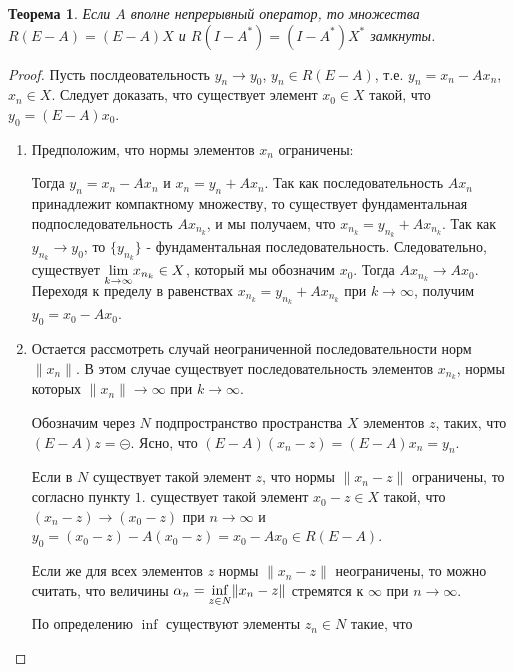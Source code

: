 \documentclass[12pt,a4paper,titlepage,oneside]{book}
\theoremstyle{definition}
\theoremstyle{plain}
\newtheorem*{theorem}{Теорема}
\theoremstyle{remark}
\theoremstyle{remark}
\theoremstyle{remark}
\theoremstyle{remark}
\theoremstyle{plain}
\theoremstyle{plain}
\begin{document}
\begin{theorem}
Если $A$ вполне непрерывный оператор, то множества $R(E-A)=(E-A)X$ и $R(I-A^*)=(I-A^*)X^*$ замкнуты.
\end{theorem}
\begin{proof}
Пусть послдеовательность $y_n \rightarrow y_0$, $y_n \in R(E-A)$, т.е. $y_n=x_n-Ax_n$, $x_n \in X$. Следует доказать, что существует элемент $x_0 \in X$ такой, что $y_0=(E-A)x_0$.
\begin{enumerate}

	\item Предположим, что нормы элементов $x_n$ ограничены:

Тогда $y_n=x_n-Ax_n$ и $x_n=y_n+Ax_n$. Так как последовательность $Ax_n$ принадлежит компактному множеству, то существует фундаментальная подпоследовательность $Ax_{n_k}$, и мы получаем, что $x_{n_k}=y_{n_k}+Ax_{n_k}$. Так как $y_{n_k} \rightarrow y_0$, то $\{y_{n_k}\}$ - фундаментальная последовательность. Следовательно, существует $\smash{\displaystyle\lim_{k \rightarrow \infty}} x_{n_k} \in X$, который мы обозначим $x_0$. Тогда $Ax_{n_k} \rightarrow Ax_0$. Переходя к пределу в равенствах $x_{n_k}=y_{n_k}+Ax_{n_k}$ при $k \rightarrow \infty$, получим $y_0=x_0-Ax_0$.
	
	\item Остается рассмотреть случай неограниченной последовательности норм $\lVert x_n \rVert$. В этом случае существует последовательность элементов $x_{n_k}$, нормы которых $\lVert x_n \rVert \rightarrow \infty$ при $k \rightarrow \infty$.
	
	Обозначим через $N$ подпространство пространства $X$ элементов $z$, таких, что $(E-A)z=\circleddash$. Ясно, что $(E-A)(x_n-z)=(E-A)x_n=y_n$.
	
	Если в $N$ существует такой элемент $z$, что нормы $\lVert x_n-z \rVert$ ограничены, то согласно пункту $1.$ существует такой элемент $x_0-z \in X$ такой, что $(x_n-z)\rightarrow (x_0-z)$ при $n \rightarrow \infty$ и $y_0=(x_0-z)-A(x_0-z)=x_0-Ax_0 \in R(E-A)$.
	
	Если же для всех элементов $z$ нормы $\lVert x_n-z \rVert$ неограничены, то можно считать, что величины $\alpha_n=\smash{\displaystyle\inf_{z \in N}} \lVert x_n-z \rVert$ стремятся к $\infty$ при $n \rightarrow \infty$.
	
	По определению $\inf$ существуют элементы $z_n \in N$ такие, что 
	

\end{enumerate}
\end{proof}
\end{document}
